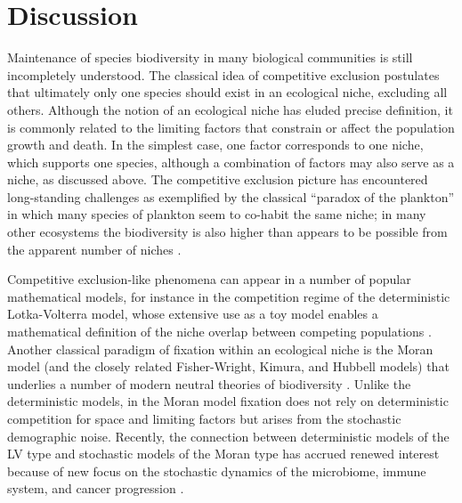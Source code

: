 \section{Discussion}
Maintenance of species biodiversity in many biological communities is still incompletely understood. 
The classical idea of competitive exclusion postulates that ultimately only one species should exist in an ecological niche, excluding all others. 
Although the notion of an ecological niche has eluded precise definition, it is commonly related to the limiting factors that constrain or affect the population growth and death. 
In the simplest case, one factor corresponds to one niche, which supports one species, although a combination of factors may also serve as a niche, as discussed above. 
The competitive exclusion picture has encountered long-standing challenges as exemplified by the classical ``paradox of the plankton'' \cite{Hutchinson1961,Chesson2000} in which many species of plankton seem to co-habit the same niche; in many other ecosystems the biodiversity is also higher than appears to be possible from the apparent number of niches \cite{MacArthur1957,Shmida1984,May1999,Chesson2000,Hubbell2001}.

Competitive exclusion-like phenomena can appear in a number of popular mathematical models, for instance in the competition regime of the deterministic Lotka-Volterra model, whose extensive use as a toy model enables a mathematical definition of the niche overlap between competing populations \cite{MacArthur1967,Abrams1980,Schoener1985,Chesson2008}. 
Another classical paradigm of fixation within an ecological niche is the Moran model (and the closely related Fisher-Wright, Kimura, and Hubbell models) that underlies a number of modern neutral theories of biodiversity \cite{Moran1962,Lin2012,Kimura1968,Kingman1982,Hubbell2001,Abrams1983,Mayfield2010}. 
Unlike the deterministic models, in the Moran model fixation does not rely on deterministic competition for space and limiting factors but arises from the stochastic demographic noise. 
Recently, the connection between deterministic models of the LV type and stochastic models of the Moran type has accrued renewed interest because of new focus on the stochastic dynamics of the microbiome, immune system, and cancer progression \cite{Antal2006,Lin2012,Constable2015,Chotibut2015,Ashcroft2015,Assaf2016,Vega2017,Posfai2017}. %

